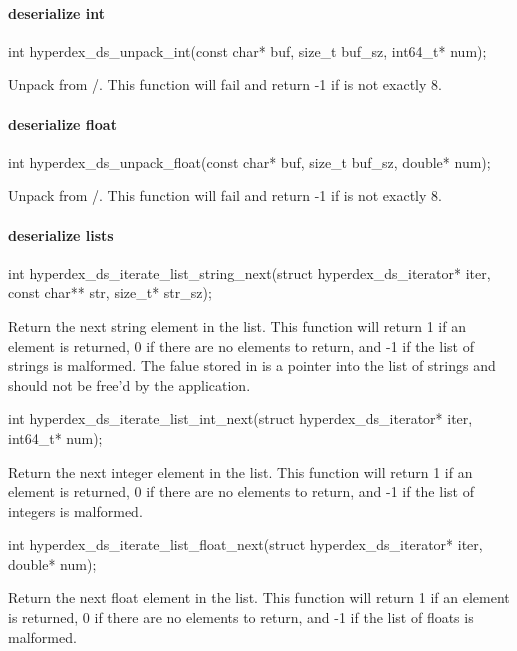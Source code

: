 \paragraph{deserialize int}

\begin{ccode}
int hyperdex_ds_unpack_int(const char* buf, size_t buf_sz, int64_t* num);
\end{ccode}
\funcdesc Unpack  from /.  This function will
fail and return -1 if  is not exactly \unit{8}{\byte}.

\paragraph{deserialize float}

\begin{ccode}
int hyperdex_ds_unpack_float(const char* buf, size_t buf_sz, double* num);
\end{ccode}
\funcdesc Unpack  from /.  This function will
fail and return -1 if  is not exactly \unit{8}{\byte}.

\paragraph{deserialize lists}

\begin{ccode}
int hyperdex_ds_iterate_list_string_next(struct hyperdex_ds_iterator* iter,
                                         const char** str, size_t* str_sz);
\end{ccode}
\funcdesc Return the next string element in the list.  This function will return
1 if an element is returned, 0 if there are no elements to return, and -1 if the
list of strings is malformed.  The falue stored in  is a pointer into
the list of strings and should not be free'd by the application.

\funcsep
\begin{ccode}
int hyperdex_ds_iterate_list_int_next(struct hyperdex_ds_iterator* iter, int64_t* num);
\end{ccode}
\funcdesc Return the next integer element in the list.  This function will
return 1 if an element is returned, 0 if there are no elements to return, and -1
if the list of integers is malformed.

\funcsep
\begin{ccode}
int hyperdex_ds_iterate_list_float_next(struct hyperdex_ds_iterator* iter, double* num);
\end{ccode}
\funcdesc Return the next float element in the list.  This function will return
1 if an element is returned, 0 if there are no elements to return, and -1 if the
list of floats is malformed.


